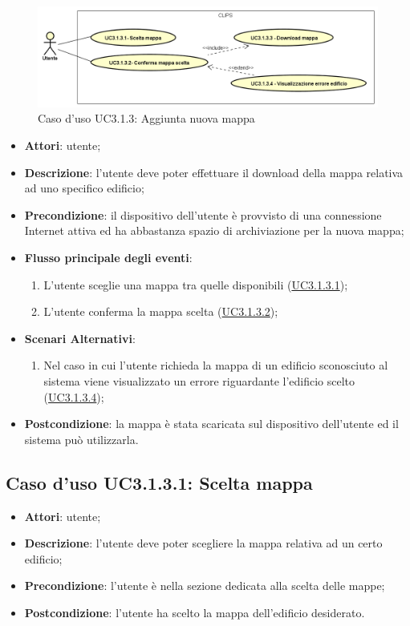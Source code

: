 \documentclass[../AnalisiDeiRequisiti.tex]{subfiles}
\begin{document}
        \begin{figure}[!h]
            \centering
            \includegraphics[scale=0.95, width=\textwidth]{img/UC3-1-3.png}
            \caption{Caso d'uso UC3.1.3: Aggiunta nuova mappa}\label{fig:UC3.1.3} 
        \end{figure}
\begin{itemize}
\item \textbf{Attori}: utente;
\item \textbf{Descrizione}: l'utente deve poter effettuare il download della mappa relativa ad uno specifico edificio; 
      \item \textbf{Precondizione}: il dispositivo dell'utente è provvisto di una connessione Internet attiva ed ha abbastanza spazio di archiviazione per la nuova mappa;

        \item \textbf{Flusso principale degli eventi}:
          \begin{enumerate}
          \item L'utente sceglie una mappa tra quelle disponibili (\hyperlink{UC3.1.3.1}{UC3.1.3.1});
          \item L'utente conferma la mappa scelta  (\hyperlink{UC3.1.3.2}{UC3.1.3.2});

      \end{enumerate}
    \item \textbf{Scenari Alternativi}:
      \begin{enumerate}
          \item Nel caso in cui l'utente richieda la mappa di un edificio sconosciuto al sistema viene visualizzato un errore riguardante l'edificio scelto 
 (\hyperlink{UC3.1.3.4}{UC3.1.3.4});

      \end{enumerate}
    \item \textbf{Postcondizione}: la mappa è stata scaricata sul dispositivo dell'utente ed il sistema può utilizzarla.
  \end{itemize}
\hypertarget{UC3.1.3.1}{}
\subsection{Caso d'uso UC3.1.3.1: Scelta mappa}
\begin{itemize}
\item \textbf{Attori}: utente;
\item \textbf{Descrizione}: l'utente deve poter scegliere la mappa relativa ad un certo edificio; 
      \item \textbf{Precondizione}: l'utente è nella sezione dedicata alla scelta delle mappe;
    \item \textbf{Postcondizione}: l'utente ha scelto la mappa dell'edificio desiderato.
  \end{itemize}
\hypertarget{UC3.1.3.2}{}
\end{document}
